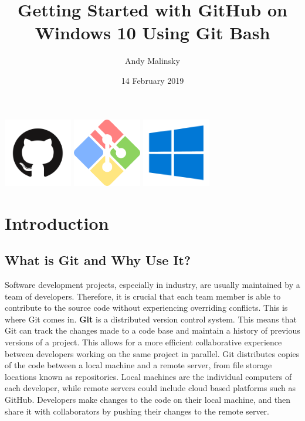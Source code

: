 \documentclass[12pt]{article}
\title{Getting Started with GitHub on Windows 10 Using Git Bash}
\author{Andy Malinsky}
\date{14 February 2019}
\begin{document}
\maketitle
\hfill
\begin{multicols}{3}[\columnsep=1cm]
    \centering
    \includegraphics[width=3cm]{GitHub-Mark}
\columnbreak
    \centering
    \includegraphics[width=3cm]{gwindows_logo}
\columnbreak
    \centering
    \includegraphics[width=3cm]{Windows-10-Icon}
\end{multicols}
\newpage

\tableofcontents
\newpage

\section{Introduction}
\subsection{What is Git and Why Use It?}
Software development projects, especially in industry, are usually maintained by a team of developers. Therefore, it is crucial that each team member is able to contribute to the source code without experiencing overriding conflicts. This is where Git comes in. \textbf{Git} is a distributed version control system. This means that Git can track the changes made to a code base and maintain a history of previous versions of a project. This allows for a more efficient collaborative experience between developers working on the same project in parallel. Git distributes copies of the code between a local machine and a remote server, from file storage locations known as repositories. Local machines are the individual computers of each developer, while remote servers could include cloud based platforms such as GitHub. Developers make changes to the code on their local machine, and then share it with collaborators by pushing their changes to the remote server.
\end{document}
